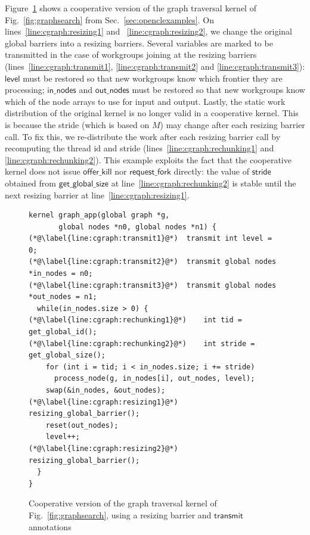 \documentclass[sigconf]{acmart}
\newcommand{\myfig}{Fig.~}
\newcommand{\myfiglong}{Figure~}
\newcommand{\mysec}{Sec.~}
\newcommand{\transmit}{\mathsf{transmit}}
\newcommand{\offerfork}{\mathsf{request\_fork}}
\newcommand{\offerkill}{\mathsf{offer\_kill}}
\newcommand{\getglobalsize}{\mathsf{get\_global\_size}}
\newcommand{\keyword}[1]{\mathsf{#1}}
\begin{document}
{
\myfiglong\ref{fig:cgraphsearch} shows a cooperative version of the
graph traversal kernel of \myfig\ref{fig:graphsearch} from
\mysec\ref{sec:openclexamples}.  On lines~\ref{line:cgraph:resizing1}
and ~\ref{line:cgraph:resizing2}, we change the original global
barriers into a resizing barriers. Several variables are marked to be
transmitted in the case of workgroups joining at the resizing barriers
(lines~\ref{line:cgraph:transmit1}, \ref{line:cgraph:transmit2} and
\ref{line:cgraph:transmit3}): $\keyword{level}$ must be restored so
that new workgroups know which frontier they are processing;
$\keyword{in\_nodes}$ and $\keyword{out\_nodes}$ must be restored so
that new workgroups know which of the node arrays to use for input and
output. Lastly, the static work distribution of the original kernel is
no longer valid in a cooperative kernel. This is because the stride
(which is based on $M$) may change after each resizing barrier
call. To fix this, we re-distribute the work after each resizing
barrier call by recomputing the thread id and stride
(lines~\ref{line:cgraph:rechunking1} and
\ref{line:cgraph:rechunking2}). This example exploits the fact that
the cooperative kernel does not issue $\offerkill$ nor $\offerfork$
directly: the value of $\keyword{stride}$ obtained from
$\getglobalsize$ at line~\ref{line:cgraph:rechunking2} is stable
until the next resizing barrier at line~\ref{line:cgraph:resizing1}.

\begin{figure}

\begin{lstlisting}
kernel graph_app(global graph *g,
       global nodes *n0, global nodes *n1) {
(*@\label{line:cgraph:transmit1}@*)  transmit int level = 0;
(*@\label{line:cgraph:transmit2}@*)  transmit global nodes *in_nodes = n0;
(*@\label{line:cgraph:transmit3}@*)  transmit global nodes *out_nodes = n1;
  while(in_nodes.size > 0) {
(*@\label{line:cgraph:rechunking1}@*)    int tid = get_global_id();
(*@\label{line:cgraph:rechunking2}@*)    int stride = get_global_size();
    for (int i = tid; i < in_nodes.size; i += stride)
      process_node(g, in_nodes[i], out_nodes, level);
    swap(&in_nodes, &out_nodes);
(*@\label{line:cgraph:resizing1}@*)    resizing_global_barrier();
    reset(out_nodes);
    level++;
(*@\label{line:cgraph:resizing2}@*)    resizing_global_barrier();
  }
}
\end{lstlisting}
\caption{Cooperative version of the graph traversal kernel of \myfig\ref{fig:graphsearch}, using a resizing barrier and $\transmit$ annotations}\label{fig:cgraphsearch}
\end{figure}

}
\end{document}

